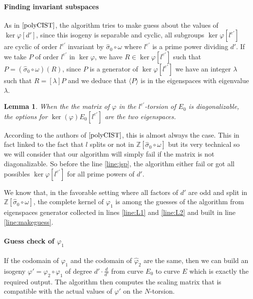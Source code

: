 \documentclass[12pt,a4paper]{article}
\newtheorem{lemma}{Lemma}
\begin{document}
			\paragraph{Finding invariant subspaces}

			As in $\cite{polyCIST}$, the algorithm tries to make guess about the values of $\ker\varphi[d']$,
			since this isogeny is separable and cyclic,
			all subgroups $\ker\varphi[l^{e'}]$ are cyclic of order $l^{e'}$ invariant by
			$\widehat\sigma_0\circ\omega$ where $l^{e'}$ is a prime power dividing $d'$. 
			If we take $P$ of order $l^{e'}$ in $\ker\varphi$, we have $R\in\ker\varphi[l^{e'}]$ such that
			$P=(\widehat\sigma_0\circ\omega)(R)$, since $P$ is a generator of $\ker\varphi[l^{e'}]$ we have an
			integer $\lambda$ such that $R=[\lambda]P$ and we deduce that $\langle P \rangle$ is in the
			eigenspaces with eigenvalue $\lambda$. 

			\begin{lemma}
				When the the matrix of $\varphi$ in the $l^{e'}$-torsion of $E_0$ is diagonalizable, the options for
				$\ker(\varphi) E_0[l^{e'}]$ are the two eigenspaces.
			\end{lemma}
			
			According to the authors of $\cite{polyCIST}$, this is almost always the case. This in fact linked
			to the fact that $l$ splits or not in $\mathbb Z[\widehat\sigma_0\circ\omega]$ but its very
			technical so we will consider that our algorithm will simply fail if the matrix is not
			diagonalizable. So before the line \ref{line:jsp},
			the algorithm either fail or got all possibles $\ker\varphi[l^{e'}]$ for all prime powers of
			$d'$.

			We know that, in the favorable setting where all factors of $d'$ are odd and split in
			$\mathbb Z[\widehat\sigma_0\circ\omega]$,
			the complete kernel of  $\varphi_1$ is among the guesses of the algorithm from
			eigenspaces generator collected in lines \ref{line:L1} and \ref{line:L2} and built in line
			\ref{line:makeguess}.
			
			\paragraph{Guess check of $\varphi_1$}

			If the codomain of $\varphi_1$ and the codomain of $\widehat\varphi_2$ are the same, then we can
			build an isogeny $\varphi'=\varphi_2\circ\varphi_1$ of degree  $d'\cdot \frac{d}{d'}$ from curve
			$E_0$ to curve $E$ which is exactly the required output. The algorithm then computes the scaling
			matrix that is compatible with the actual values of $\varphi'$ on the $N$-torsion.
			
\end{document}
